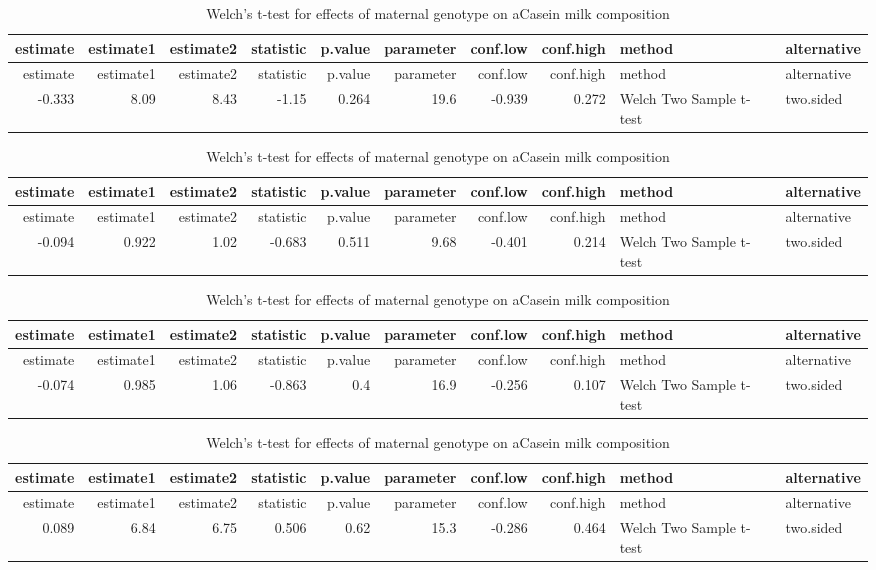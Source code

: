 \documentclass[]{article}
\begin{document}
\begin{longtable}[]{@{}rrrrrrrrll@{}}
\caption{Welch's t-test for effects of maternal genotype on aCasein milk
composition}\tabularnewline
\toprule
estimate & estimate1 & estimate2 & statistic & p.value & parameter &
conf.low & conf.high & method & alternative\tabularnewline
\midrule
\endfirsthead
\toprule
estimate & estimate1 & estimate2 & statistic & p.value & parameter &
conf.low & conf.high & method & alternative\tabularnewline
\midrule
\endhead
-0.333 & 8.09 & 8.43 & -1.15 & 0.264 & 19.6 & -0.939 & 0.272 & Welch Two
Sample t-test & two.sided\tabularnewline
\bottomrule
\end{longtable}

\begin{longtable}[]{@{}rrrrrrrrll@{}}
\caption{Welch's t-test for effects of maternal genotype on aCasein milk
composition}\tabularnewline
\toprule
estimate & estimate1 & estimate2 & statistic & p.value & parameter &
conf.low & conf.high & method & alternative\tabularnewline
\midrule
\endfirsthead
\toprule
estimate & estimate1 & estimate2 & statistic & p.value & parameter &
conf.low & conf.high & method & alternative\tabularnewline
\midrule
\endhead
-0.094 & 0.922 & 1.02 & -0.683 & 0.511 & 9.68 & -0.401 & 0.214 & Welch
Two Sample t-test & two.sided\tabularnewline
\bottomrule
\end{longtable}

\begin{longtable}[]{@{}rrrrrrrrll@{}}
\caption{Welch's t-test for effects of maternal genotype on aCasein milk
composition}\tabularnewline
\toprule
estimate & estimate1 & estimate2 & statistic & p.value & parameter &
conf.low & conf.high & method & alternative\tabularnewline
\midrule
\endfirsthead
\toprule
estimate & estimate1 & estimate2 & statistic & p.value & parameter &
conf.low & conf.high & method & alternative\tabularnewline
\midrule
\endhead
-0.074 & 0.985 & 1.06 & -0.863 & 0.4 & 16.9 & -0.256 & 0.107 & Welch Two
Sample t-test & two.sided\tabularnewline
\bottomrule
\end{longtable}

\begin{longtable}[]{@{}rrrrrrrrll@{}}
\caption{Welch's t-test for effects of maternal genotype on aCasein milk
composition}\tabularnewline
\toprule
estimate & estimate1 & estimate2 & statistic & p.value & parameter &
conf.low & conf.high & method & alternative\tabularnewline
\midrule
\endfirsthead
\toprule
estimate & estimate1 & estimate2 & statistic & p.value & parameter &
conf.low & conf.high & method & alternative\tabularnewline
\midrule
\endhead
0.089 & 6.84 & 6.75 & 0.506 & 0.62 & 15.3 & -0.286 & 0.464 & Welch Two
Sample t-test & two.sided\tabularnewline
\bottomrule
\end{longtable}
\end{document}
